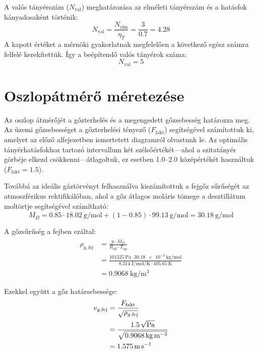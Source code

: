 A valós tányérszám ($N_{\text{val}}$) meghatározása az elméleti
tányérszám és a hatásfok hányadosaként történik:
\begin{equation}
  N_{\text{val}} = \frac{N_{\text{elm}}}{\eta_T} = \frac{3}{\num{0.7}} = \num{4.28}
\end{equation}
A kapott értéket a mérnöki gyakorlatnak megfelelően a következő egész
számra felfelé kerekítettük. Így a beépítendő valós tányérok száma:
\begin{equation*}
  N_{\text{val}} = 5
\end{equation*}

\section{Oszlopátmérő méretezése}

Az oszlop átmérőjét a gőzterhelés és a megengedett gőzsebesség
határozza meg. Az üzemi gőzsebességet a gőzterhelési tényező
($F_{\mathrm{fakt}}$) segítségével számítottuk ki, amelyet az előző
alfejezetben ismertetett diagramról olvastunk le. Az optimális
tányérhatásfokhoz tartozó intervallum két szélsőértékét---ahol a
szitatányér görbéje
elkezd csökkenni---átlagoltuk, ez esetben \numrange{1.0}{2.0}
középértékét használtuk (\(F_{\text{fakt}}=\num{1.5}\)).

Továbbá az ideális gáztörvényt felhasználva kiszámítottuk a fejgőz
sűrűségét az atmoszférikus rektifikálóban, ahol a gőz átlagos moláris
tömege a desztillátum moltörtje segítségével számítható:
\begin{equation}
  \overline{M_D}=\num{0.85}\cdot \qty{18.02}{\gram\per\mol} +
  (1-\num{0.85})\cdot \qty{99.13}{\gram\per\mol}=\qty{30.18}{\gram\per\mol}
\end{equation}

A gőzsűrűség a fejben ezáltal:
\begin{equation}
  \begin{split}
    \rho_{g,\text{fej}}&=\frac{p\cdot\overline{M_D}}{R_{\text{all}}\cdot
    T_{\text{bp}}}\\
    &= \frac{\qty{101325}{\pascal}\cdot
    \qty{30.18e-3}{\kilo\gram\per\mol}}{\qty{8.314}{\joule\per\mol\per\kelvin}\cdot\qty{405.65}{\kelvin}}\\
    &= \qty{0.9068}{\kg\per\cubic\metre}
  \end{split}
\end{equation}

Ezekkel együtt a gőz határsebessége:
\begin{equation}
  \begin{split}
    v_{g,\text{fej}} &=
    \frac{F_{\text{fakt}}}{\sqrt{\rho_{g,\text{fej}}}}\\
    &=
    \frac{\qty{1.5}{\sqrt{\pascal}}}{\sqrt{\qty{0.9068}{\kg\per\cubic\metre}}}\\
    &= \qty{1.575}{\metre\per\second}
  \end{split}
\end{equation}

